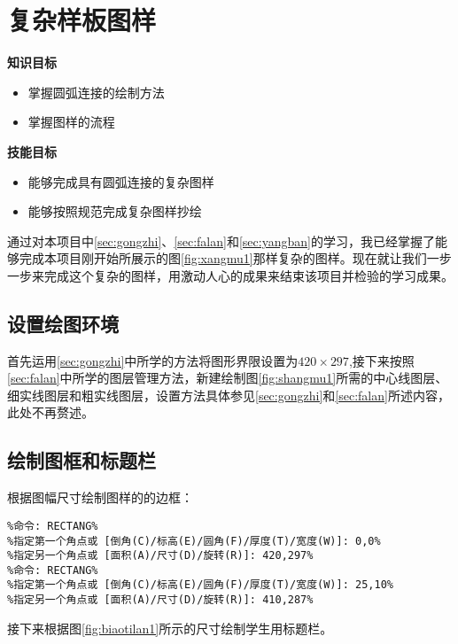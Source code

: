 \section{复杂样板图样}

{\bfseries 知识目标}
\begin{itemize}
\item 掌握圆弧连接的绘制方法
\item 掌握图样的流程
\end{itemize}

{\bfseries 技能目标}
\begin{itemize}
\item 能够完成具有圆弧连接的复杂图样
\item 能够按照规范完成复杂图样抄绘
\end{itemize}

通过对本项目中\ref{sec:gongzhi}、\ref{sec:falan}和\ref{sec:yangban}的学习，我已经掌握了能够完成本项目刚开始所展示的图\ref{fig:xangmu1}那样复杂的图样。现在就让我们一步一步来完成这个复杂的图样，用激动人心的成果来结束该项目并检验的学习成果。
\subsection{设置绘图环境}
首先运用\ref{sec:gongzhi}中所学的方法将图形界限设置为$420\times 297$,接下来按照\ref{sec:falan}中所学的图层管理方法，新建绘制图\ref{fig:shangmu1}所需的中心线图层、细实线图层和粗实线图层，设置方法具体参见\ref{sec:gongzhi}和\ref{sec:falan}所述内容，此处不再赘述。
\subsection{绘制图框和标题栏}
根据图幅尺寸绘制图样的的边框：
\begin{lstlisting}
%命令: RECTANG%
%指定第一个角点或 [倒角(C)/标高(E)/圆角(F)/厚度(T)/宽度(W)]: 0,0%
%指定另一个角点或 [面积(A)/尺寸(D)/旋转(R)]: 420,297%
%命令: RECTANG%
%指定第一个角点或 [倒角(C)/标高(E)/圆角(F)/厚度(T)/宽度(W)]: 25,10%
%指定另一个角点或 [面积(A)/尺寸(D)/旋转(R)]: 410,287%
\end{lstlisting}
接下来根据图\ref{fig:biaotilan1}所示的尺寸绘制学生用标题栏。

